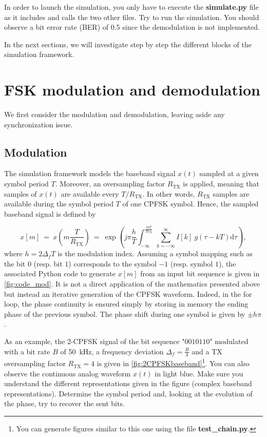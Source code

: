 In order to launch the simulation, you only have to execute the \textbf{simulate.py} file as it includes and calls the two other files. Try to run the simulation. You should observe a bit error rate (BER) of 0.5 since the demodulation is not implemented.

In the next sections, we will investigate step by step the different blocks of the simulation framework.

\section{FSK modulation and demodulation}
We first consider the modulation and demodulation, leaving aside any synchronization issue.

\subsection{Modulation}
The simulation framework models the baseband signal $x(t)$ sampled at a given symbol period $T$. Moreover, an oversampling factor $R_{\text{TX}}$ is applied, meaning that samples of $x(t) $ are available every $T/R_{\text{TX}}$. In other words, $R_{\text{TX}}$ samples are available during the symbol period $T$ of one CPFSK symbol. Hence, the sampled baseband signal is defined by

\begin{equation*}
    x[m] \:=\:x\left(m\frac{T}{R_{\text{TX}}}\right)\:=\:\exp \left(j\pi \frac{h}{T} \int_{-\infty}^{\frac{mT}{R_{\text{TX}}}} \sum_{k=-\infty}^{\infty}I[k]\:g(\tau-kT) \text{d}\tau \right),
\end{equation*}
where $h=2 \Delta_f T$ is the modulation index.
Assuming a symbol mapping such as the bit $0$ (resp. bit $1$) corresponds to the symbol $-1$ (resp. symbol $1$), the associated Python code to generate $x[m]$ from an input bit sequence is given in \autoref{fig:code_mod}. It is not a direct application of the mathematics presented above but instead an iterative generation of the CPFSK waveform. Indeed, in the for loop, the phase continuity is ensured simply by storing in memory the ending phase of the previous symbol. The phase shift during one symbol is given by $\pm h\pi$.

\begin{listing}[H]
\caption{Python code for 2-CPFSK modulation.}
\label{fig:code_mod}
\end{listing}



As an example, the 2-CPFSK signal of the bit sequence "$0010110$" modulated with a bit rate $B$ of \SI{50}{\kilo\hertz}, a frequency deviation $\Delta_f=\frac{B}{4}$ and a TX oversampling factor $R_{\text{TX}}=4$ is given in \autoref{fig:2CPFSKbaseband}\footnote{You can generate figures similar to this one using the file \textbf{test\_chain.py}.}. You can also observe the continuous analog waveform $x(t)$ in light blue. Make sure you understand the different representations given in the figure (complex baseband representations). Determine the symbol period and, looking at the evolution of the phase, try to recover the sent bits.


